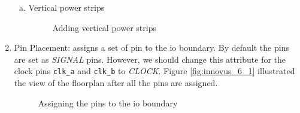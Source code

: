 \documentclass[a4paper,11pt]{article}%
\begin{document}
\begin{enumerate}[1.)]
\begin{enumerate}[a.]
		\item Vertical power strips
		\begin{figure}[H]
			\centering
			\caption{Adding vertical power strips}
			\label{fig:innovus_4_4}
		\end{figure}	
	\end{enumerate}
	
	\pagebreak
	\item Pin Placement: assigns a set of pin to the \ac{io} boundary. By default the pins are set as \textit{SIGNAL} pins. However, we should change this attribute for the clock pins {\tt clk\_a} and {\tt clk\_b} to \textit{CLOCK}. Figure \ref{fig:innovus_6_1} illustrated the view of the floorplan after all the pins are assigned.
	
	\begin{figure}[H]
		\centering
		\caption{Assigning the pins to the \ac{io} boundary}
		\label{fig:innovus_5_5}
	\end{figure}


\end{enumerate}
\end{document}
